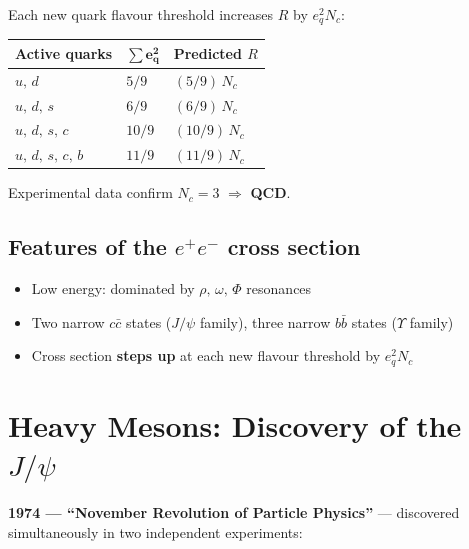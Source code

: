 Each new quark flavour threshold increases $R$ by $e_q^2 N_c$:

\vspace{6pt}
\begin{center}
\begin{tabular}{C{3.5cm} C{2.5cm} C{3.5cm}}
  \toprule
  \color{white}\textbf{Active quarks} &
  \color{white}$\boldsymbol{\sum e_q^2}$ &
  \color{white}\textbf{Predicted $R$} \\
  \midrule
  $u,\, d$           & $5/9$  & $(5/9)\, N_c$  \\
  $u,\, d,\, s$      & $6/9$  & $(6/9)\, N_c$  \\
  $u,\, d,\, s,\, c$ & $10/9$ & $(10/9)\, N_c$ \\
  $u,\, d,\, s,\, c,\, b$ & $11/9$ & $(11/9)\, N_c$ \\
  \bottomrule
\end{tabular}
\end{center}
\vspace{6pt}

Experimental data confirm $\boxed{N_c = 3}$ $\Rightarrow$ \textbf{QCD}.

\subsection{Features of the \texorpdfstring{$e^+e^-$}{e+e-} cross section}

\begin{itemize}
  \item Low energy: dominated by $\rho,\,\omega,\,\Phi$ resonances
  \item Two narrow $c\bar{c}$ states ($J/\psi$ family), three narrow $b\bar{b}$ states ($\Upsilon$ family)
  \item Cross section \textbf{steps up} at each new flavour threshold by $e_q^2 N_c$
\end{itemize}

\section{Heavy Mesons: Discovery of the \texorpdfstring{$J/\psi$}{J/psi}}

\textbf{1974 --- ``November Revolution of Particle Physics''} --- discovered simultaneously
in two independent experiments:


